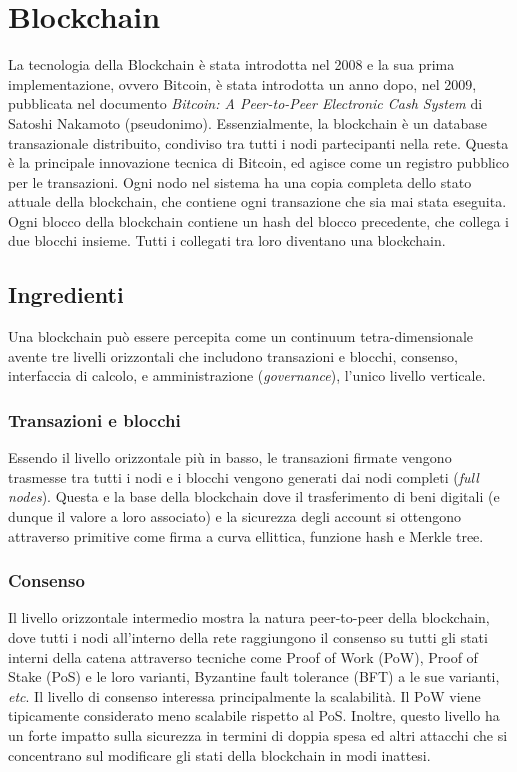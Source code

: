 \documentclass[a4paper,12pt]{article}
\begin{document}
\section{Blockchain}
La tecnologia della Blockchain è stata introdotta nel 2008 e la sua prima implementazione, ovvero Bitcoin, è stata introdotta un anno dopo, nel 2009, pubblicata nel documento \emph{Bitcoin: A Peer-to-Peer Electronic Cash System} \cite{21} di Satoshi Nakamoto (pseudonimo). Essenzialmente, la blockchain è un database transazionale distribuito, condiviso tra tutti i nodi partecipanti nella rete. Questa è la principale innovazione tecnica di Bitcoin, ed agisce come un registro pubblico per le transazioni. Ogni nodo nel sistema ha una copia completa dello stato attuale della blockchain, che contiene ogni transazione che sia mai stata eseguita. Ogni blocco della blockchain contiene un hash del blocco precedente, che collega i due blocchi insieme. Tutti i collegati tra loro diventano una blockchain.

\subsection{Ingredienti}
Una blockchain può essere percepita come un continuum tetra-dimensionale avente tre livelli orizzontali che includono transazioni e blocchi, consenso, interfaccia di calcolo, e amministrazione (\emph{governance}), l'unico livello verticale.

\subsubsection{Transazioni e blocchi}
Essendo il livello orizzontale più in basso, le transazioni firmate vengono trasmesse tra tutti i nodi e i blocchi vengono generati dai nodi completi (\emph{full nodes}). Questa e la base della blockchain dove il trasferimento di beni digitali (e dunque il valore a loro associato) e la sicurezza degli account si ottengono attraverso primitive come firma a curva ellittica, funzione hash e Merkle tree.

\subsubsection{Consenso}
Il livello orizzontale intermedio mostra la natura peer-to-peer della blockchain, dove tutti i nodi all'interno della rete raggiungono il consenso su tutti gli stati interni della catena  attraverso tecniche come Proof of Work (PoW), Proof of Stake (PoS) e le loro varianti, Byzantine fault tolerance (BFT) a le sue varianti, \emph{etc}. Il livello di consenso interessa principalmente la scalabilità. Il PoW viene tipicamente considerato meno scalabile rispetto al PoS. Inoltre, questo livello ha un forte impatto sulla sicurezza in termini di doppia spesa ed altri attacchi che si concentrano sul modificare gli stati della blockchain in modi inattesi.
\end{document}
